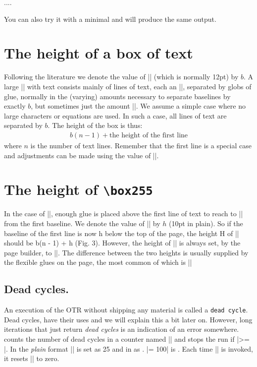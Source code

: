 \begin{teXXX}
....
\showthe\pagedepth
\bye
\end{teXXX}

You can also try it with a \latex minimal and will produce the same output.


\section{The height of a box of text}

Following the literature we denote the value of |\baselineskip| (which is normally 12pt) by $b$. 
A
large |\vbox| with text consists mainly of lines of
text, each an |\hbox|, separated by globs of glue,
normally in the (varying) amounts necessary to
separate baselines by exactly $b$, but sometimes just
the amount |\lineskip|. We assume a simple case
where no large characters or equations are used. In
such a case, all lines of text are separated by $b$. The
height of the box is thus:
\begin{gather}
b(n - 1) + \text{the height of the first line}
\end{gather}
where $n$ is the number of text lines. Remember that the first line is a special case and adjustments can be made using the value of |\topskip|.

\section{The height of \texttt{\textbackslash box255}}

In the case of ||,
enough glue is placed above the first line of text
to reach to |\topskip| from the first baseline. We
denote the value of |\topskip| by $h$ (10pt in plain).
So if the baseline of the first line is now h below the
top of the page, the height H of || should
be b(n - 1) + h (Fig. 3). However, the height of
|| is always set, by the page builder, to
|\vsize|. The difference between the two heights is
usually supplied by the flexible glues on the page,
the most common of which is |\parskip|

\begin{comment}
\begin{figure}[htp]
\texttt{[image: ./graphics/heightofpagebox.jpg]}
\end{figure}
\end{comment}

\subsection{Dead cycles.} An execution of the OTR without shipping any material is called a \texttt{dead cycle}. Dead cycles, have their uses and we will explain this a bit later on. However, long iterations that just return \textit{dead cycles} is an indication of an error somewhere. \tex counts the number of dead cycles in a counter named |\deadcycles| and stops the run if |\deadcycles >= \maxdeadcycles|.  In the \textit{plain} format |\maxdeadcycles| is set as 25 and in \latex as \the\deadcycles. |\maxdeadcycles = 100| is \the\maxdeadcycles. Each time |\shipout| is invoked, it resets |\deadcycles| to zero.

